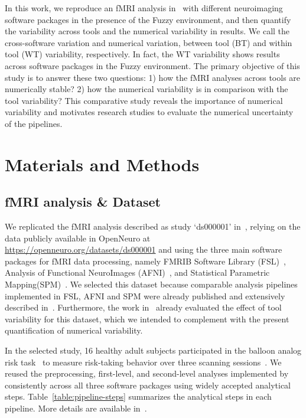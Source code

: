 In this work, we reproduce an fMRI analysis in~\cite{bowring2019exploring} with different neuroimaging software packages in the presence of the Fuzzy environment,
and then quantify the variability across tools and the numerical variability in results.
We call the cross-software variation and numerical variation, between tool (BT) and within tool (WT) variability, respectively.
In fact, the WT variability shows results across software packages in the Fuzzy environment.
The primary objective of this study is to answer these two questions: 1) how the fMRI analyses across tools are numerically stable?
2) how the numerical variability is in comparison with the tool variability?
This comparative study reveals the importance of numerical variability and motivates research studies to evaluate the numerical uncertainty of the pipelines.

\section{Materials and Methods}

\subsection{fMRI analysis \& Dataset}

We replicated the fMRI analysis described as study `ds000001'
in~\cite{schonberg2012decreasing}, relying on the
data publicly available in OpenNeuro at
\url{https://openneuro.org/datasets/ds000001} and using the three main
software packages for fMRI data processing, namely FMRIB Software Library
(FSL)~\cite{jenkinson2012fsl}, Analysis of Functional NeuroImages
(AFNI)~\cite{cox1996afni}, and Statistical Parametric
Mapping(SPM)~\cite{penny2011statistical}. We selected this dataset because
comparable analysis pipelines implemented in FSL, AFNI and SPM 
were already published and extensively described in~\cite{bowring2019exploring}.
Furthermore, the work in~\cite{bowring2019exploring} already evaluated the effect of tool variability for
this dataset, which we intended to complement with the present quantification of numerical variability.

In the selected study, 16 healthy adult subjects participated in the
balloon analog risk task~\cite{lejuez2002evaluation} to measure
risk-taking behavior over three scanning sessions~\cite{schonberg2012decreasing}.
We reused the preprocessing, first-level, and
second-level analyses implemented by~\cite{bowring2019exploring} consistently across all three software packages using 
widely accepted analytical steps. Table~\ref{table:pipeline-steps} summarizes the analytical steps in each pipeline.
More details are available in~\cite{bowring2019exploring}.



